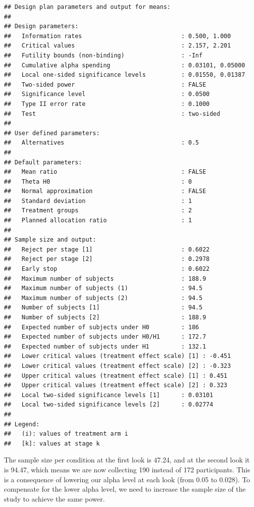 \documentclass[
  oneside]{krantz}
\begin{document}
\begin{verbatim}
## Design plan parameters and output for means:
## 
## Design parameters:
##   Information rates                            : 0.500, 1.000 
##   Critical values                              : 2.157, 2.201 
##   Futility bounds (non-binding)                : -Inf 
##   Cumulative alpha spending                    : 0.03101, 0.05000 
##   Local one-sided significance levels          : 0.01550, 0.01387 
##   Two-sided power                              : FALSE 
##   Significance level                           : 0.0500 
##   Type II error rate                           : 0.1000 
##   Test                                         : two-sided 
## 
## User defined parameters:
##   Alternatives                                 : 0.5 
## 
## Default parameters:
##   Mean ratio                                   : FALSE 
##   Theta H0                                     : 0 
##   Normal approximation                         : FALSE 
##   Standard deviation                           : 1 
##   Treatment groups                             : 2 
##   Planned allocation ratio                     : 1 
## 
## Sample size and output:
##   Reject per stage [1]                         : 0.6022 
##   Reject per stage [2]                         : 0.2978 
##   Early stop                                   : 0.6022 
##   Maximum number of subjects                   : 188.9 
##   Maximum number of subjects (1)               : 94.5 
##   Maximum number of subjects (2)               : 94.5 
##   Number of subjects [1]                       : 94.5 
##   Number of subjects [2]                       : 188.9 
##   Expected number of subjects under H0         : 186 
##   Expected number of subjects under H0/H1      : 172.7 
##   Expected number of subjects under H1         : 132.1 
##   Lower critical values (treatment effect scale) [1] : -0.451 
##   Lower critical values (treatment effect scale) [2] : -0.323 
##   Upper critical values (treatment effect scale) [1] : 0.451 
##   Upper critical values (treatment effect scale) [2] : 0.323 
##   Local two-sided significance levels [1]      : 0.03101 
##   Local two-sided significance levels [2]      : 0.02774 
## 
## Legend:
##   (i): values of treatment arm i
##   [k]: values at stage k
\end{verbatim}

The sample size per condition at the first look is 47.24, and at the second look it is 94.47, which means we are now collecting 190 instead of 172 participants. This is a consequence of lowering our alpha level at each look (from 0.05 to 0.028). To compensate for the lower alpha level, we need to increase the sample size of the study to achieve the same power.
\end{document}
